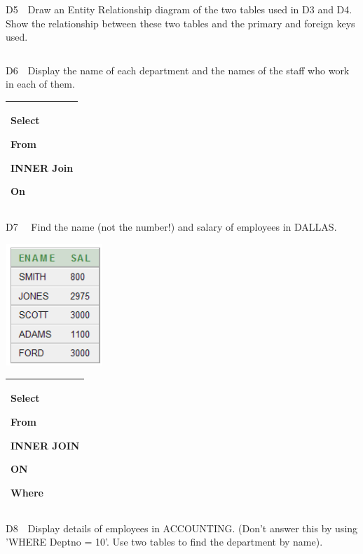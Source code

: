 D5\ \ Draw an Entity Relationship diagram of the two tables used in D3 and D4. Show the relationship between these two tables and the primary and foreign keys used.

\begin{flushleft}
\tablefirsthead{}
\tablehead{}
\tabletail{}
\tablelasttail{}
\begin{supertabular}{|l|}
\hline
\\\hline
\end{supertabular}
\end{flushleft}
D6\ \ Display the name of each department and the names of the staff who work in each of them.

\begin{flushleft}
\tablefirsthead{}
\tablehead{}
\tabletail{}
\tablelasttail{}
\begin{supertabular}{|m{14.303cm}|}
\hline
Select

From

INNER Join

On\\\hline
\end{supertabular}
\end{flushleft}
D7  \ \ Find the name (not the number!) and salary of employees in DALLAS.



\begin{center}
  
\includegraphics[width=3.669cm,height=4.586cm]{images/img (38).png}

\end{center}
\begin{flushleft}
\tablefirsthead{}
\tablehead{}
\tabletail{}
\tablelasttail{}
\begin{supertabular}{|m{11.110001cm}|}
\hline
Select

From

INNER JOIN

ON

Where\\\hline
\end{supertabular}
\end{flushleft}
D8\ \ Display details of employees in ACCOUNTING.  (Don't answer this by using  {}'WHERE Deptno = 10'.  Use two tables to find the department by name).

